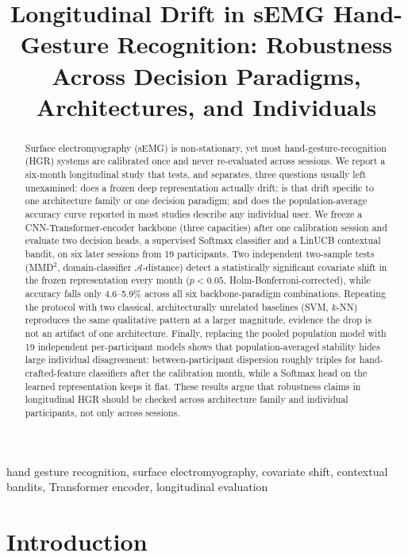 \documentclass{article}
\title{Longitudinal Drift in sEMG Hand-Gesture Recognition: Robustness Across Decision Paradigms, Architectures, and Individuals}
\begin{document}
\maketitle

\begin{abstract}
Surface electromyography (sEMG) is non-stationary, yet most hand-gesture-recognition (HGR) systems are calibrated once and never re-evaluated across sessions. We report a six-month longitudinal study that tests, and separates, three questions usually left unexamined: does a frozen deep representation actually drift; is that drift specific to one architecture family or one decision paradigm; and does the population-average accuracy curve reported in most studies describe any individual user. We freeze a CNN-Transformer-encoder backbone (three capacities) after one calibration session and evaluate two decision heads, a supervised Softmax classifier and a LinUCB contextual bandit, on six later sessions from 19 participants. Two independent two-sample tests (MMD$^2$, domain-classifier $\mathcal{A}$-distance) detect a statistically significant covariate shift in the frozen representation every month ($p<0.05$, Holm-Bonferroni-corrected), while accuracy falls only 4.6--5.9\% across all six backbone-paradigm combinations. Repeating the protocol with two classical, architecturally unrelated baselines (SVM, $k$-NN) reproduces the same qualitative pattern at a larger magnitude, evidence the drop is not an artifact of one architecture. Finally, replacing the pooled population model with 19 independent per-participant models shows that population-averaged stability hides large individual disagreement: between-participant dispersion roughly triples for hand-crafted-feature classifiers after the calibration month, while a Softmax head on the learned representation keeps it flat. These results argue that robustness claims in longitudinal HGR should be checked across architecture family and individual participants, not only across sessions.
\end{abstract}

\begin{keywords}
hand gesture recognition, surface electromyography, covariate shift, contextual bandits, Transformer encoder, longitudinal evaluation
\end{keywords}

\section{Introduction}
\label{sec:intro}
\end{document}
